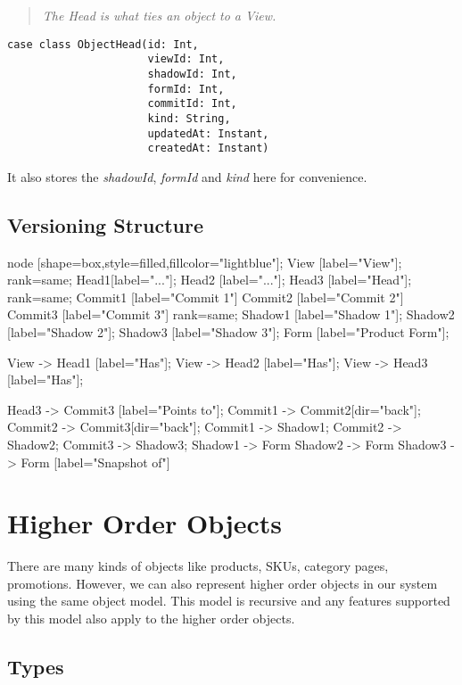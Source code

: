 \documentclass[11pt]{article}
\begin{document}
\begin{quote}
    \emph{The Head is what ties an object to a View.}
\end{quote}

\begin{lstlisting}
case class ObjectHead(id: Int,
                      viewId: Int,
                      shadowId: Int,
                      formId: Int,
                      commitId: Int,
                      kind: String,
                      updatedAt: Instant,
                      createdAt: Instant)
\end{lstlisting}

It also stores the \emph{shadowId}, \emph{formId} and \emph{kind} here for convenience.

\subsection{Versioning Structure}
 {
    node [shape=box,style=filled,fillcolor="lightblue"];
    View [label="View"];
    {
        rank=same;
        Head1[label="..."];
        Head2 [label="..."];
        Head3 [label="Head"];
    }
    {
        rank=same;
        Commit1 [label="Commit 1"]
        Commit2 [label="Commit 2"]
        Commit3 [label="Commit 3"]
    }
    {
        rank=same;
        Shadow1 [label="Shadow 1"];
        Shadow2 [label="Shadow 2"];
        Shadow3 [label="Shadow 3"];
    }
    Form [label="Product Form"];

    View -> Head1 [label="Has"];
    View -> Head2 [label="Has"];
    View -> Head3 [label="Has"];

    Head3 -> Commit3 [label="Points to"];
    Commit1 -> Commit2[dir="back"];
    Commit2 -> Commit3[dir="back"];
    Commit1 -> Shadow1;
    Commit2 -> Shadow2;
    Commit3 -> Shadow3;
    Shadow1 -> Form 
    Shadow2 -> Form 
    Shadow3 -> Form [label="Snapshot of"]
}

\newpage
\section{Higher Order Objects}

There are many kinds of objects like products, SKUs, category pages, promotions.
However, we can also represent higher order objects in our system using the same
object model. This model is recursive and any features supported by this model
also apply to the higher order objects.

\subsection{Types}
\end{document}
